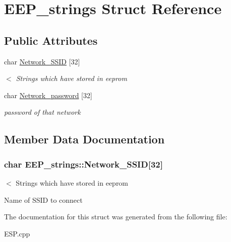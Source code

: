 \hypertarget{structEEP__strings}{}\section{E\+E\+P\+\_\+strings Struct Reference}
\label{structEEP__strings}
\subsection*{Public Attributes}
\begin{DoxyCompactItemize}
\item 
char \hyperlink{structEEP__strings_a306b42bbc00f8f0fad740a488b716b58}{Network\+\_\+\+S\+S\+ID} \mbox{[}32\mbox{]}
\begin{DoxyCompactList}\small\item\em $<$ Strings which have stored in eeprom \end{DoxyCompactList}\item 
char \hyperlink{structEEP__strings_a6244224cc32d54c75024d6f45ead702b}{Network\+\_\+password} \mbox{[}32\mbox{]}\hypertarget{structEEP__strings_a6244224cc32d54c75024d6f45ead702b}{}\label{structEEP__strings_a6244224cc32d54c75024d6f45ead702b}

\begin{DoxyCompactList}\small\item\em password of that network \end{DoxyCompactList}\end{DoxyCompactItemize}


\subsection{Member Data Documentation}
\subsubsection[{\texorpdfstring{Network\+\_\+\+S\+S\+ID}{Network_SSID}}]{\setlength{\rightskip}{0pt plus 5cm}char E\+E\+P\+\_\+strings\+::\+Network\+\_\+\+S\+S\+ID\mbox{[}32\mbox{]}}\hypertarget{structEEP__strings_a306b42bbc00f8f0fad740a488b716b58}{}\label{structEEP__strings_a306b42bbc00f8f0fad740a488b716b58}


$<$ Strings which have stored in eeprom 

Name of S\+S\+ID to connect 

The documentation for this struct was generated from the following file\+:\begin{DoxyCompactItemize}
\item 
E\+S\+P.\+cpp\end{DoxyCompactItemize}
